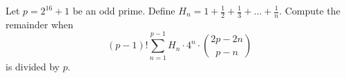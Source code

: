 Let $p = 2^{16}+1$ be an odd prime. Define $H_n = 1+ \frac{1}{2} + \frac{1}{3} + \ldots + \frac{1}{n}$. Compute the remainder when \[ (p-1)! \sum_{n = 1}^{p-1} H_n \cdot 4^n \cdot \binom{2p-2n}{p-n} \] is divided by $p$.
